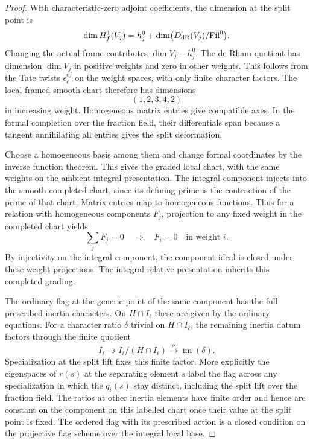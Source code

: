 \begin{proof}
With characteristic-zero adjoint coefficients, the dimension at the split point is
\[
 \dim H^1_f(V_j)=h^0_j+\dim\bigl(D_{\rm dR}(V_j)/\mathrm{Fil}^0\bigr).
\]
Changing the actual frame contributes
\(\dim V_j-h^0_j\). The de Rham quotient has
dimension \(\dim V_j\) in positive weights and
zero in other weights. This follows from the
Tate twists \(\epsilon_\ell^{ej}\) on the
weight spaces, with only finite character
factors. The local framed smooth chart therefore
has dimensions
\[
                    (1,2,3,4,2)
                    \tag{9}\label{eq:rank-three-crystalline-chart}
\]
in increasing weight. Homogeneous matrix
entries give compatible axes. In the formal
completion over the fraction field, their
differentials span because a tangent annihilating
all entries gives the split deformation.

Choose
a homogeneous basis among them and change formal
coordinates by the inverse function theorem.
This gives the graded local chart, with the
same weights on the ambient integral
presentation. The integral component injects into
the smooth completed chart, since its defining
prime is the contraction of the prime of that
chart. Matrix entries map to homogeneous functions.
Thus for a relation with homogeneous components \(F_j\), projection to any fixed weight in the completed chart yields
\[
 \sum_j F_j=0\quad\Longrightarrow\quad F_i=0\quad\text{in weight }i .
\] By injectivity on the
integral component, the component ideal is closed
under these weight projections. The integral
relative presentation inherits this completed
grading.
\hfill\mbox{\cite{bloch-kato-finite,colmez-fontaine,kisin-crystalline}}\label{cor:ordinary-rank-three-length-5}

The ordinary flag at the generic point of
the same component has the full prescribed
inertia characters. On \(H\cap I_\ell\)
these are given by the ordinary equations.
For a character ratio \(\delta\) trivial on \(H\cap I_\ell\), the remaining inertia datum factors through the finite quotient
\[
 I_\ell\twoheadrightarrow I_\ell/(H\cap I_\ell)\xrightarrow{\ \delta\ }\operatorname{im}(\delta).
\]
Specialization at the split lift fixes this finite factor.
More explicitly the eigenspaces of \(r(s)\)
at the separating element \(s\) label the
flag across any specialization in which
the \(q_i(s)\) stay distinct, including
the split lift over the fraction field.
The ratios at other inertia elements
have finite order and hence are constant
on the component on this labelled
chart once their value at the split
point is fixed. The ordered flag with
its prescribed action is a closed
condition on the projective flag
scheme over the integral local base.


\end{proof}

